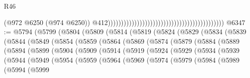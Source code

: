 \begin{lexlean}{R46}
\begin{coremodule}
                                                                                            (@972
                                                                                              @6250
                                                                                              (@974
                                                                                                @6250))
                                                                                            @412))))))))))))))))))))))))))))))))))))))))))))
@6347 := @5794
    (@5799
      (@5804
        (@5809
          (@5814
            (@5819
              (@5824
                (@5829
                  (@5834
                    (@5839
                      (@5844
                        (@5849
                          (@5854
                            (@5859
                              (@5864
                                (@5869
                                  (@5874
                                    (@5879
                                      (@5884
                                        (@5889
                                          (@5894
                                            (@5899
                                              (@5904
                                                (@5909
                                                  (@5914
                                                    (@5919
                                                      (@5924
                                                        (@5929
                                                          (@5934
                                                            (@5939
                                                              (@5944
                                                                (@5949
                                                                  (@5954
                                                                    (@5959
                                                                      (@5964
                                                                        (@5969
                                                                          (@5974
                                                                            (@5979
                                                                              (@5984
                                                                                (@5989
                                                                                  (@5994
                                                                                    (@5999

\end{coremodule}
\end{lexlean}
